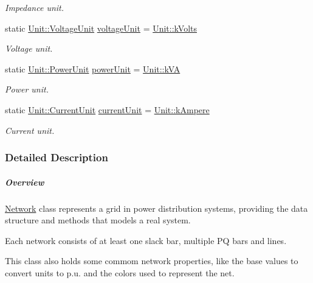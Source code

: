 \begin{DoxyCompactItemize}
\begin{DoxyCompactList}\small\item\em Impedance unit. \end{DoxyCompactList}\item 
static \hyperlink{class_unit_a55b07dfa9457e1eca2c7194fe0cfc3c1}{Unit\+::\+Voltage\+Unit} \hyperlink{group___models_gacde031ef95f5c05565ee35769f2ed89e}{voltage\+Unit} = \hyperlink{class_unit_a55b07dfa9457e1eca2c7194fe0cfc3c1aa54b2473993a702a3923525765bd6e4c}{Unit\+::k\+Volts}
\begin{DoxyCompactList}\small\item\em Voltage unit. \end{DoxyCompactList}\item 
static \hyperlink{class_unit_ace265ae255370ccacfd5370337572c3b}{Unit\+::\+Power\+Unit} \hyperlink{group___models_ga9504015bc566f4a3d3b4d4a86000293b}{power\+Unit} = \hyperlink{class_unit_ace265ae255370ccacfd5370337572c3ba72b181a842ae2759488a2fa1410d3696}{Unit\+::k\+V\+A}
\begin{DoxyCompactList}\small\item\em Power unit. \end{DoxyCompactList}\item 
static \hyperlink{class_unit_a0794cf6c9682f48296dd4a5315389787}{Unit\+::\+Current\+Unit} \hyperlink{group___models_gac6a26db5fef2b1dd2a00faf6340d1702}{current\+Unit} = \hyperlink{class_unit_a0794cf6c9682f48296dd4a5315389787a368a3c470f0b590a6100dda717a7dd4f}{Unit\+::k\+Ampere}
\begin{DoxyCompactList}\small\item\em Current unit. \end{DoxyCompactList}\end{DoxyCompactItemize}


\subsubsection{Detailed Description}
\subparagraph*{Overview}

\hyperlink{class_network}{Network} class represents a grid in power distribution systems, providing the data structure and methods that models a real system.

Each network consists of at least one slack bar, multiple P\+Q bars and lines.

This class also holds some commom network properties, like the base values to convert units to p.\+u. and the colors used to represent the net.

